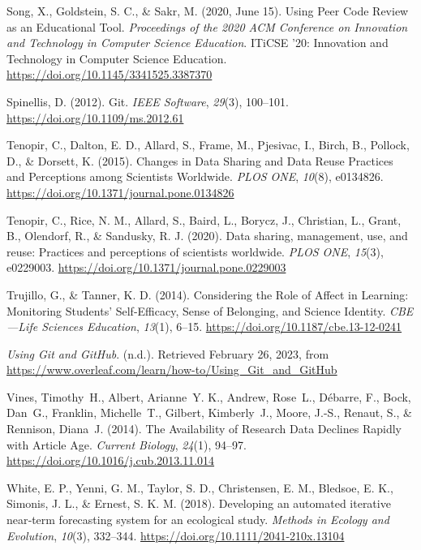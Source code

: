 \begin{CSLReferences}{1}{0}
\leavevmode{}%
Song, X., Goldstein, S. C., \& Sakr, M. (2020, June 15). Using Peer Code Review as an Educational Tool. \emph{Proceedings of the 2020 ACM Conference on Innovation and Technology in Computer Science Education}. ITiCSE '20: Innovation and Technology in Computer Science Education. \url{https://doi.org/10.1145/3341525.3387370}

\leavevmode{}%
Spinellis, D. (2012). Git. \emph{IEEE Software}, \emph{29}(3), 100--101. \url{https://doi.org/10.1109/ms.2012.61}

\leavevmode{}%
Tenopir, C., Dalton, E. D., Allard, S., Frame, M., Pjesivac, I., Birch, B., Pollock, D., \& Dorsett, K. (2015). Changes in Data Sharing and Data Reuse Practices and Perceptions among Scientists Worldwide. \emph{PLOS ONE}, \emph{10}(8), e0134826. \url{https://doi.org/10.1371/journal.pone.0134826}

\leavevmode{}%
Tenopir, C., Rice, N. M., Allard, S., Baird, L., Borycz, J., Christian, L., Grant, B., Olendorf, R., \& Sandusky, R. J. (2020). Data sharing, management, use, and reuse: Practices and perceptions of scientists worldwide. \emph{PLOS ONE}, \emph{15}(3), e0229003. \url{https://doi.org/10.1371/journal.pone.0229003}

\leavevmode{}%
Trujillo, G., \& Tanner, K. D. (2014). Considering the Role of Affect in Learning: Monitoring Students' Self-Efficacy, Sense of Belonging, and Science Identity. \emph{CBE---Life Sciences Education}, \emph{13}(1), 6--15. \url{https://doi.org/10.1187/cbe.13-12-0241}

\leavevmode{}%
\emph{Using Git and GitHub}. (n.d.). Retrieved February 26, 2023, from \url{https://www.overleaf.com/learn/how-to/Using_Git_and_GitHub}

\leavevmode{}%
Vines, Timothy~H., Albert, Arianne~Y. K., Andrew, Rose~L., Débarre, F., Bock, Dan~G., Franklin, Michelle~T., Gilbert, Kimberly~J., Moore, J.-S., Renaut, S., \& Rennison, Diana~J. (2014). The Availability of Research Data Declines Rapidly with Article Age. \emph{Current Biology}, \emph{24}(1), 94--97. \url{https://doi.org/10.1016/j.cub.2013.11.014}

\leavevmode{}%
White, E. P., Yenni, G. M., Taylor, S. D., Christensen, E. M., Bledsoe, E. K., Simonis, J. L., \& Ernest, S. K. M. (2018). Developing an automated iterative near‐term forecasting system for an ecological study. \emph{Methods in Ecology and Evolution}, \emph{10}(3), 332--344. \url{https://doi.org/10.1111/2041-210x.13104}


\end{CSLReferences}
